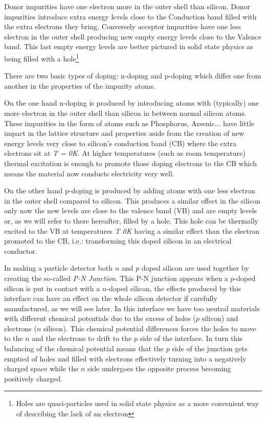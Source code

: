 Donor impurities have one electron more in the outer shell than silicon. Donor impurities introduce extra energy levels close to the Conduction band filled with the extra electrons they bring. Conversely acceptor impurities have one less electron in the outer shell producing new empty energy levels close to the Valence band. This last empty energy levels are better pictured in solid state physics as being filled with a hole\footnote{Holes are quasi-particles used in solid state physics as a more convenient way of describing the lack of an electron}



There are two basic types of doping: n-doping and p-doping which differ one from another in the properties of the impurity atoms.

On the one hand n-doping is produced by introducing atoms with (typically) one more electron in the outer shell than silicon in between normal silicon atoms. These impurities in the form of atoms such as Phosphorus, Arsenic... have little impact in the lattice structure and properties aside from the creation of new energy levels very close to silicon’s conduction band (CB) where the extra electrons sit at \textit{T = 0K}. At higher temperatures (such as room temperature) thermal excitation is enough to promote those doping electrons to the CB which means the material now conducts electricity very well.

On the other hand p-doping is produced by adding atoms with one less electron in the outer shell compared to silicon. This produces a similar effect in the silicon only now the new levels are close to the valence band (VB) and are empty levels or, as we will refer to there hereafter, filled by a hole. This hole can be thermally excited to the VB at temperatures \textit{T \beq 0K} having a similar effect than the electron promoted to the CB, i.e.: transforming this doped silicon in an electrical conductor.

In making a particle detector both $n$ and $p$ doped silicon are used together by creating the so-called \textit{P-N Junction}. This P-N junction appears when a $p$-doped silicon is put in contact with a $n$-doped silicon, the effects produced by this interface can have an effect on the whole silicon detector if carefully manufactured, as we will see later. In this interface we have too neutral materials with different chemical potentials due to the excess of holes ($p$ silicon) and electrons ($n$ silicon). This chemical potential differences forces the holes to move to the $n$ and the electrons to drift to the $p$ side of the interface. In turn this balancing of the chemical potential means that the $p$ side of the junction gets emptied of holes and filled with electrons effectively turning into a negatively charged space while the $n$ side undergoes the opposite process becoming positively charged.

